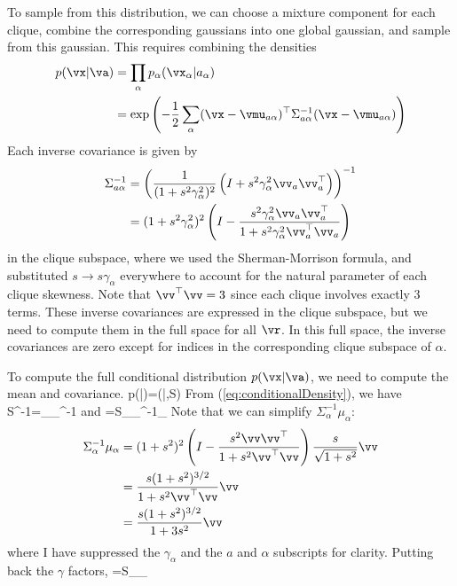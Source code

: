 \documentclass[11pt,twocolumn]{article}
\begin{document}
To sample from this distribution, we can choose a mixture component for each clique,  combine the corresponding gaussians into one global gaussian, and sample from this gaussian. This requires combining the densities
\begin{align}
p(\vx|\va)&=\prod_\alpha p_\alpha(\vx_\alpha|a_\alpha)\\
&=\exp{\left(-\frac{1}{2}\sum_\alpha (\vx-\vmu_{a\alpha})^\top\Sigma_{a\alpha}^{-1}(\vx-\vmu_{a\alpha})\right)}
\label{eq:conditionalDensity}
\end{align}
Each inverse covariance is given by
\begin{align}
\Sigma^{-1}_{a\alpha}&=\left(\frac{1}{(1+s^2\gamma_\alpha^2)^2}\left(I+s^2\gamma_\alpha^2\vv_a\vv_a^\top\right)\right)^{-1}\\
&=(1+s^2\gamma_\alpha^2)^2\left(I-\frac{s^2\gamma_\alpha^2\vv_a\vv_a^\top}{1+s^2\gamma_\alpha^2\vv_a^\top\vv_a}\right)
\end{align}
in the clique subspace, where we used the Sherman-Morrison formula, and substituted $s\to s\gamma_\alpha$ everywhere to account for the natural parameter of each clique skewness. Note that $\vv^\top\vv=3$ since each clique involves exactly 3 terms. These inverse covariances are expressed in the clique subspace, but we need to compute them in the full space for all $\vr$. In this full space, the inverse covariances are zero except for indices in the corresponding clique subspace of $\alpha$.

To compute the full conditional distribution $p(\vx|\va)$, we need to compute the mean and covariance.
\be
p(\vr|\va)=(\vx|\vm,S)
\ee
From (\ref{eq:conditionalDensity}), we have
\be
S^{-1}=\sum_\alpha \Sigma_\alpha^{-1}
\ee
and
\be
\vm=S\sum_\alpha \Sigma_\alpha^{-1}\mu_\alpha
\ee
Note that we can simplify $\Sigma_\alpha^{-1}\mu_\alpha$:
\begin{align}
\Sigma_\alpha^{-1}\mu_\alpha
&=(1+s^2)^2\left(I-\frac{s^2\vv\vv^\top}{1+s^2\vv^\top\vv}\right)\frac{s}{\sqrt{1+s^2}}\vv\\
&=\frac{s(1+s^2)^{3/2}}{1+s^2\vv^\top\vv}\vv\\
&=\frac{s(1+s^2)^{3/2}}{1+3s^2}\vv
\end{align}
where I have suppressed the $\gamma_\alpha$ and the $a$ and $\alpha$ subscripts for clarity. Putting back the $\gamma$ factors,
\be
\vm=S\sum_\alpha {}\vv_\alpha
\ee
\end{document}
